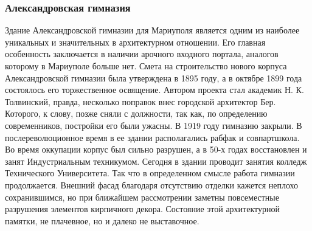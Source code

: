  
 
 
 
 

\subsubsection{Александровская гимназия}

Здание Александровской гимназии для Мариуполя является одним из наиболее
уникальных и значительных в архитектурном отношении. Его главная особенность
заключается в наличии арочного входного портала, аналогов которому в Мариуполе
больше нет. Смета на строительство нового корпуса Александровской гимназии была
утверждена в 1895 году, а в октябре 1899 года состоялось его торжественное
освящение. Автором проекта стал академик Н. К. Толвинский, правда, несколько
поправок внес городской архитектор Бер. Которого, к слову, позже сняли с
должности, так как, по определению современников, постройки его были ужасны. В
1919 году гимназию закрыли. В послереволюционное время в ее здании
располагались рабфак и совпартшкола. Во время оккупации корпус был сильно
разрушен, а в 50-х годах восстановлен и занят Индустриальным техникумом.
Сегодня в здании проводит занятия колледж Технического Университета. Так что в
определенном смысле работа гимназии продолжается. Внешний фасад благодаря
отсутствию отделки кажется неплохо сохранившимся, но при ближайшем рассмотрении
заметны повсеместные разрушения элементов кирпичного декора. Состояние этой
архитектурной памятки, не плачевное, но и далеко не выставочное.

